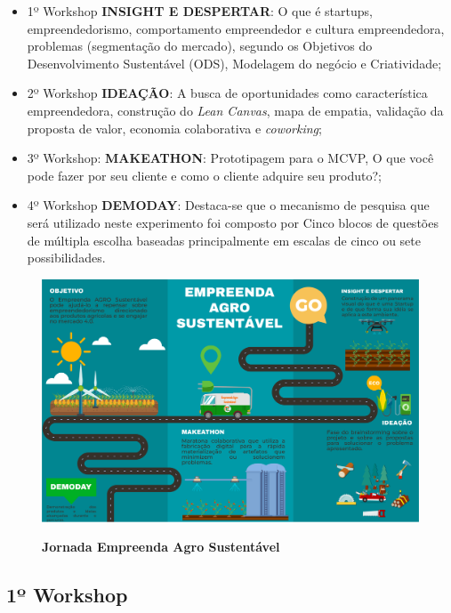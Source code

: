 \begin{itemize}

\item {1º Workshop \textbf{INSIGHT E DESPERTAR}: O que é startups, empreendedorismo, comportamento empreendedor e cultura empreendedora, problemas (segmentação do mercado), segundo os Objetivos do Desenvolvimento Sustentável (ODS), Modelagem do negócio e Criatividade;}
\item {2º Workshop \textbf{IDEAÇÃO}: A busca de oportunidades como característica empreendedora, construção do \textit{Lean Canvas}, mapa de empatia, validação da proposta de valor, economia colaborativa e \textit{coworking};}

\item {3º Workshop: \textbf{MAKEATHON}: Prototipagem para o MCVP, O que você pode fazer por seu cliente e como o cliente adquire seu produto?;}

\item {4º Workshop \textbf{DEMODAY}: Destaca-se que o mecanismo de pesquisa que será utilizado neste experimento foi composto por Cinco blocos de questões de múltipla escolha baseadas principalmente em escalas de cinco ou sete possibilidades.}
\end{itemize}

\begin{figure}[!htb]
\centering
\caption{\textbf{Jornada Empreenda Agro Sustentável}}
\includegraphics[scale=0.4]{Imagens/jornada.png}
\label{figura_17}
\end{figure}





\subsection{1º Workshop}

